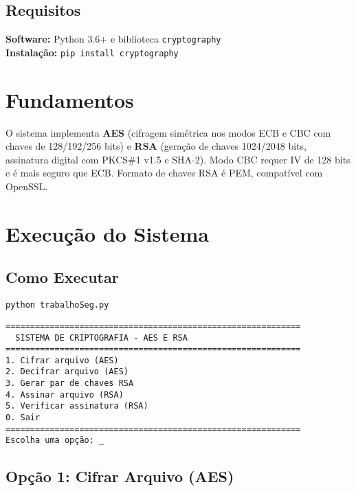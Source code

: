 \documentclass[12pt,a4paper]{article}
\begin{document}
\subsection{Requisitos}

\begin{tcolorbox}[colback=darkblue!5,colframe=darkblue!50]
\textbf{Software:} Python 3.6+ e biblioteca \texttt{cryptography}\\
\textbf{Instalação:} \texttt{pip install cryptography}
\end{tcolorbox}

\section{Fundamentos}

O sistema implementa \textbf{AES} (cifragem simétrica nos modos ECB e CBC com chaves de 128/192/256 bits) e \textbf{RSA} (geração de chaves 1024/2048 bits, assinatura digital com PKCS\#1 v1.5 e SHA-2). Modo CBC requer IV de 128 bits e é mais seguro que ECB. Formato de chaves RSA é PEM, compatível com OpenSSL.

\section{Execução do Sistema}

\subsection{Como Executar}

\begin{lstlisting}[style=bashstyle]
python trabalhoSeg.py
\end{lstlisting}

\begin{tcolorbox}[colback=darkblue!90,coltext=white]
\footnotesize
\begin{verbatim}
============================================================
  SISTEMA DE CRIPTOGRAFIA - AES E RSA
============================================================
1. Cifrar arquivo (AES)
2. Decifrar arquivo (AES)
3. Gerar par de chaves RSA
4. Assinar arquivo (RSA)
5. Verificar assinatura (RSA)
0. Sair
============================================================
Escolha uma opção: _
\end{verbatim}
\end{tcolorbox}

\subsection{Opção 1: Cifrar Arquivo (AES)}
\end{document}
